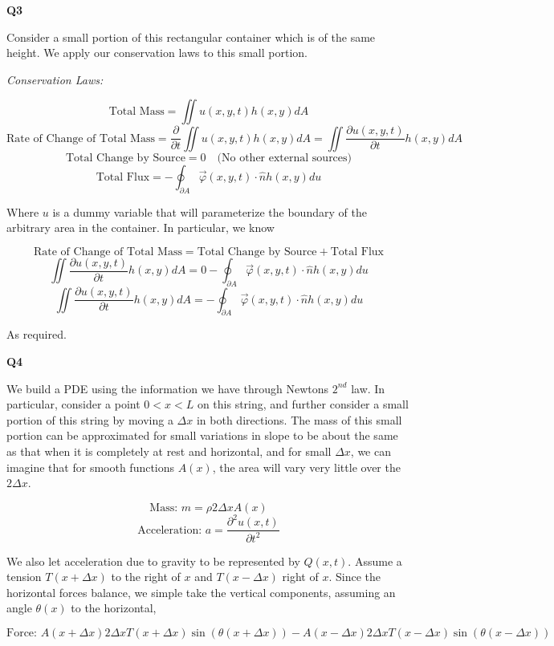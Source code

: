 \documentclass[10pt]{article}
\begin{document}
\textbf{Q3}

Consider a small portion of this rectangular container which is of the same height. We apply our conservation laws to this small portion.

\textit{Conservation Laws:}

$$\text{Total Mass} = \iint u(x,y,t)h(x,y)dA$$
$$\text{Rate of Change of Total Mass} = \frac{\partial}{\partial t}\iint u(x,y,t)h(x,y)dA = \iint \frac{\partial u(x,y,t)}{\partial t}h(x,y)dA$$
$$\text{Total Change by Source} = 0 \hspace{1em} \text{(No other external sources)}$$
$$\text{Total Flux} = -\oint_{\partial A}\vec{\varphi}(x,y,t) \cdot \hat{n}h(x,y)du$$

Where $u$ is a dummy variable that will parameterize the boundary of the arbitrary area in the container. In particular, we know

$$\text{Rate of Change of Total Mass} = \text{Total Change by Source} + \text{Total Flux}$$
$$\iint \frac{\partial u(x,y,t)}{\partial t}h(x,y)dA = 0 -\oint_{\partial A}\vec{\varphi}(x,y,t) \cdot \hat{n}h(x,y)du$$
$$\iint \frac{\partial u(x,y,t)}{\partial t}h(x,y)dA = -\oint_{\partial A}\vec{\varphi}(x,y,t) \cdot \hat{n}h(x,y)du$$

As required.

\newpage

\textbf{Q4}

We build a PDE using the information we have through Newtons $2^{nd}$ law. In particular, consider a point $0 < x < L$ on this string, and further consider a small portion of this string by moving a $\Delta x$ in both directions. The mass of this small portion can be approximated for small variations in slope to be about the same as that when it is completely at rest and horizontal, and for small $\Delta x$, we can imagine that for smooth functions $A(x)$, the area will vary very little over the $2\Delta x$.

$$\text{Mass: } m = \rho 2\Delta x A(x)$$
$$\text{Acceleration: } a = \frac{\partial^{2}u(x,t)}{\partial t^{2}}$$

We also let acceleration due to gravity to be represented by $Q(x,t)$. Assume a tension $T(x+\Delta x)$ to the right of $x$ and $T(x - \Delta x)$ right of $x$. Since the horizontal forces balance, we simple take the vertical components, assuming an angle $\theta(x)$ to the horizontal,

$$\text{Force: } A(x + \Delta x)2\Delta x T(x + \Delta x) \sin (\theta(x + \Delta x)) -A(x - \Delta x)2\Delta x T(x - \Delta x) \sin (\theta(x - \Delta x)) $$
\end{document}
